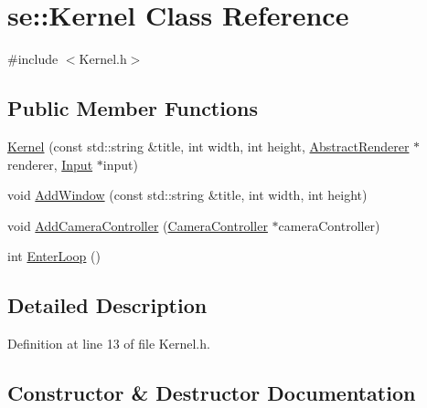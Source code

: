 \hypertarget{classse_1_1_kernel}{}\section{se\+:\+:Kernel Class Reference}
\label{classse_1_1_kernel}


{\ttfamily \#include $<$Kernel.\+h$>$}

\subsection*{Public Member Functions}
\begin{DoxyCompactItemize}
\item 
\mbox{\hyperlink{classse_1_1_kernel_a28fa4e75a4f693d01e96f63849d9cf15}{Kernel}} (const std\+::string \&title, int width, int height, \mbox{\hyperlink{classse_1_1_abstract_renderer}{Abstract\+Renderer}} $\ast$renderer, \mbox{\hyperlink{classse_1_1_input}{Input}} $\ast$input)
\item 
void \mbox{\hyperlink{classse_1_1_kernel_aafcef2223ca597327876f4f444d3521b}{Add\+Window}} (const std\+::string \&title, int width, int height)
\item 
void \mbox{\hyperlink{classse_1_1_kernel_ab35b0e949e62ab5addef0e21eb53a928}{Add\+Camera\+Controller}} (\mbox{\hyperlink{classse_1_1_camera_controller}{Camera\+Controller}} $\ast$camera\+Controller)
\item 
int \mbox{\hyperlink{classse_1_1_kernel_a1faeac6fce02ccd7ff76d94ad78e0754}{Enter\+Loop}} ()
\end{DoxyCompactItemize}


\subsection{Detailed Description}


Definition at line 13 of file Kernel.\+h.



\subsection{Constructor \& Destructor Documentation}
\mbox{\label{classse_1_1_kernel_a28fa4e75a4f693d01e96f63849d9cf15}} 
